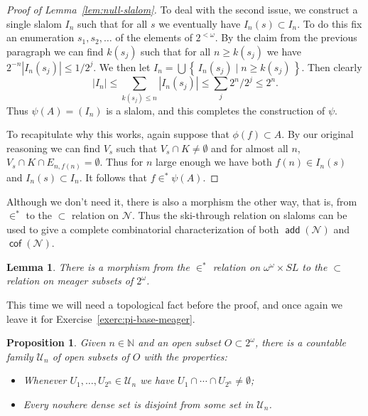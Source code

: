 \documentclass[11pt,oneside]{amsbook}
\newcommand{\set}[1]{\left\{\,#1\,\right\}}
\newcommand{\N}{\mathbb N}
\newcommand{\Null}{\mathcal N}
\DeclareMathOperator{\add}{\mathsf{add}}
\DeclareMathOperator{\cof}{\mathsf{cof}}
\theoremstyle{definition}
\theoremstyle{plain}
\newtheorem{lemma}[theorem]{Lemma}
\newtheorem{proposition}[theorem]{Proposition}
\theoremstyle{definition}
\theoremstyle{remark}
\numberwithin{equation}{section}
\numberwithin{figure}{section}
\begin{document}
\begin{proof}[Proof of Lemma~\ref{lem:null-slalom}]
  To deal with the second issue, we construct a single slalom $I_n$ such that for all $s$ we eventually have $I_n(s)\subset I_n$. To do this fix an enumeration $s_1,s_2,\ldots$ of the elements of $2^{<\omega}$. By the claim from the previous paragraph we can find $k(s_j)$ such that for all $n\geq k(s_j)$ we have $2^{-n}|I_n(s_j)|\leq1/2^j$. We then let $I_n=\bigcup\set{I_n(s_j)\mid n\geq k(s_j)}$. Then clearly
  \[|I_n|\leq\sum_{k(s_j)\leq n}|I_n(s_j)|\leq\sum_{j}2^n/2^j\leq2^n\text{.}
  \]
  Thus $\psi(A)=(I_n)$ is a slalom, and this completes the construction of $\psi$.

  To recapitulate why this works, again suppose that $\phi(f)\subset A$. By our original reasoning we can find $V_s$ such that $V_s\cap K\neq\emptyset$ and for almost all $n$, $V_s\cap K\cap E_{n,f(n)}=\emptyset$. Thus for $n$ large enough we have both $f(n)\in I_n(s)$ and $I_n(s)\subset I_n$. It follows that $f\in^*\psi(A)$.
\end{proof}

Although we don't need it, there is also a morphism the other way, that is, from $\in^*$ to the $\subset$ relation on $\Null$. Thus the ski-through relation on slaloms can be used to give a complete combinatorial characterization of both $\add(\Null)$ and $\cof(\Null)$.

\begin{lemma}
  \label{lem:slalom-meager}
  There is a morphism from the $\in^*$ relation on $\omega^\omega\times SL$ to the $\subset$ relation on meager subsets of $2^\omega$.
\end{lemma}

This time we will need a topological fact before the proof, and once again we leave it for Exercise~\ref{exerc:pi-base-meager}.

\begin{proposition}
  \label{prop:pi-base-meager}
  Given $n\in\N$ and an open subset $O\subset2^\omega$, there is a countable family $\mathcal U_n$ of open subsets of $O$ with the properties:
  \begin{itemize}
  \item Whenever $U_1,\ldots,U_{2^n}\in\mathcal U_n$ we have $U_1\cap\cdots\cap U_{2^n}\neq\emptyset$;
  \item Every nowhere dense set is disjoint from some set in $\mathcal U_n$.
  \end{itemize}
\end{proposition}
\end{document}
